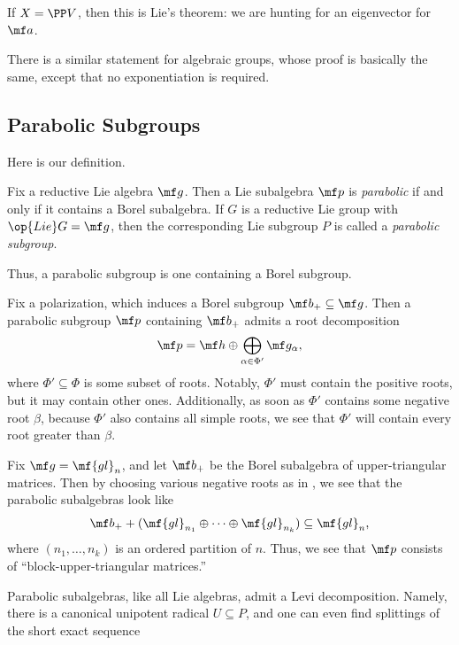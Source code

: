 \documentclass[../notes.tex]{subfiles}
\begin{document}
\begin{remark}
	If $X=\PP V$, then this is Lie's theorem: we are hunting for an eigenvector for $\mf a$.
\end{remark}
\begin{remark}
	There is a similar statement for algebraic groups, whose proof is basically the same, except that no exponentiation is required.
\end{remark}

\subsection{Parabolic Subgroups}
Here is our definition.
\begin{definition}[parabolic]
	Fix a reductive Lie algebra $\mf g$. Then a Lie subalgebra $\mf p$ is \textit{parabolic} if and only if it contains a Borel subalgebra. If $G$ is a reductive Lie group with $\op{Lie}G=\mf g$, then the corresponding Lie subgroup $P$ is called a \textit{parabolic subgroup}.
\end{definition}
\begin{remark}
	Thus, a parabolic subgroup is one containing a Borel subgroup.
\end{remark}
\begin{remark} \label{rem:parabolic-subalgebra}
	Fix a polarization, which induces a Borel subgroup $\mf b_+\subseteq\mf g$. Then a parabolic subgroup $\mf p$ containing $\mf b_+$ admits a root decomposition
	\[\mf p=\mf h\oplus\bigoplus_{\alpha\in\Phi'}\mf g_\alpha,\]
	where $\Phi'\subseteq\Phi$ is some subset of roots. Notably, $\Phi'$ must contain the positive roots, but it may contain other ones. Additionally, as soon as $\Phi'$ contains some negative root $\beta$, because $\Phi'$ also contains all simple roots, we see that $\Phi'$ will contain every root greater than $\beta$.
\end{remark}
\begin{example}
	Fix $\mf g=\mf{gl}_n$, and let $\mf b_+$ be the Borel subalgebra of upper-triangular matrices. Then by choosing various negative roots as in , we see that the parabolic subalgebras look like
	\[\mf b_++(\mf{gl}_{n_1}\oplus\cdots\oplus\mf{gl}_{n_k})\subseteq\mf{gl}_n,\]
	where $(n_1,\ldots,n_k)$ is an ordered partition of $n$. Thus, we see that $\mf p$ consists of ``block-upper-triangular matrices.'' 
\end{example}
Parabolic subalgebras, like all Lie algebras, admit a Levi decomposition. Namely, there is a canonical unipotent radical $U\subseteq P$, and one can even find splittings of the short exact sequence
\end{document}
